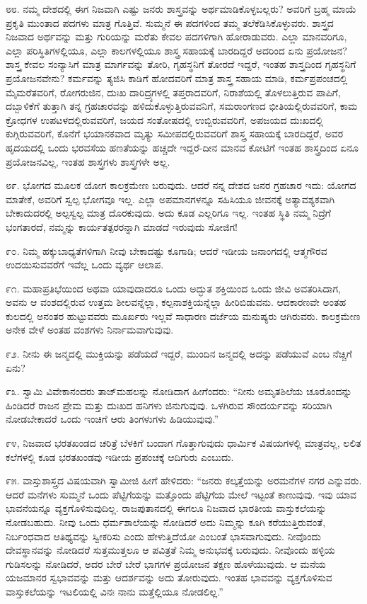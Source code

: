 ೮೮. ನಮ್ಮ ದೇಶದಲ್ಲಿ ಈಗ ನಿಜವಾಗಿ ಎಷ್ಟು ಜನರು ಶಾಸ್ತ್ರವನ್ನು ಅರ್ಥಮಾಡಿಕೊಳ್ಳಬಲ್ಲರು? ಅವರಿಗೆ ಬ್ರಹ್ಮ ಮಾಯೆ ಪ್ರಕೃತಿ ಮುಂತಾದ ಪದಗಳು ಮಾತ್ರ ಗೊತ್ತಿವೆ. ಸುಮ್ಮನೆ ಈ ಪದಗಳಿಂದ ತಮ್ಮ ತಲೆಕೆಡಿಸಿಕೊಳ್ಳುವರು. ಶಾಸ್ತ್ರದ ನಿಜವಾದ ಅರ್ಥವನ್ನು ಮತ್ತು ಗುರಿಯನ್ನು ಮರೆತು ಕೇವಲ ಪದಗಳಿಗಾಗಿ ಹೋರಾಡುವರು. ಎಲ್ಲಾ ಮಾನವರಿಗೂ, ಎಲ್ಲಾ ಪರಿಸ್ಥಿತಿಗಳಲ್ಲಿಯೂ, ಎಲ್ಲಾ ಕಾಲಗಳಲ್ಲಿಯೂ ಶಾಸ್ತ್ರ ಸಹಾಯಕ್ಕೆ ಬಾರದಿದ್ದರೆ ಅದರಿಂದ ಏನು ಪ್ರಯೋಜನ? ಶಾಸ್ತ್ರ ಕೇವಲ ಸಂನ್ಯಾಸಿಗೆ ಮಾತ್ರ ಮಾರ್ಗವನ್ನು ತೋರಿ, ಗೃಹಸ್ಥನಿಗೆ ತೋರದೆ ಇದ್ದರೆ, ಇಂತಹ ಶಾಸ್ತ್ರದಿಂದ ಗೃಹಸ್ಥನಿಗೆ ಪ್ರಯೋಜನವೇನು? ಕರ್ಮವನ್ನು ತ್ಯಜಿಸಿ ಕಾಡಿಗೆ ಹೋದವರಿಗೆ ಮಾತ್ರ ಶಾಸ್ತ್ರ ಸಹಾಯ ಮಾಡಿ, ಕರ್ಮಪ್ರಪಂಚದಲ್ಲಿ ಮೈಮರೆತವರಿಗೆ, ರೋಗರುಜಿನ, ದುಃಖ ದಾರಿದ್ರ್ಯಗಳಲ್ಲಿ ತಪ್ತರಾದವರಿಗೆ, ನಿರಾಶೆಯಲ್ಲಿ ತೊಳಲುತ್ತಿರುವ ಪಾಪಿಗೆ, ದಬ್ಬಾಳಿಕೆಗೆ ತುತ್ತಾಗಿ ತನ್ನ ಗ್ರಹಚಾರವನ್ನು ಹಳಿದುಕೊಳ್ಳುತ್ತಿರುವವನಿಗೆ, ಸಮರಾಂಗಣದ ಭೀತಿಯಲ್ಲಿರುವವರಿಗೆ, ಕಾಮ ಕ್ರೋಧಗಳ ಉಪಟಳದಲ್ಲಿರುವವರಿಗೆ, ಜಯದ ಸಂತೋಷದಲ್ಲಿ ಉಬ್ಬಿರುವವರಿಗೆ, ಅಪಜಯದ ದುಃಖದಲ್ಲಿ ಕುಗ್ಗಿರುವವರಿಗೆ, ಕೊನೆಗೆ ಭಯಾನಕವಾದ ಮೃತ್ಯು ಸಮೀಪದಲ್ಲಿರುವವರಿಗೆ ಶಾಸ್ತ್ರ ಸಹಾಯಕ್ಕೆ ಬಾರದಿದ್ದರೆ, ಅವರ ಹೃದಯದಲ್ಲಿ ಒಂದು ಭರವಸೆಯ ಹಣತೆಯನ್ನು ಹಚ್ಚದೇ ಇದ್ದರೆ-ದೀನ ಮಾನವ ಕೋಟಿಗೆ ಇಂತಹ ಶಾಸ್ತ್ರದಿಂದ ಏನೂ ಪ್ರಯೋಜನವಿಲ್ಲ, ಇಂತಹ ಶಾಸ್ತ್ರಗಳು ಶಾಸ್ತ್ರಗಳೇ ಅಲ್ಲ.

೮೯. ಭೋಗದ ಮೂಲಕ ಯೋಗ ಕಾಲಕ್ರಮೇಣ ಬರುವುದು. ಆದರೆ ನನ್ನ ದೇಶದ ಜನರ ಗ್ರಹಚಾರ ಇದು: ಯೋಗದ ಮಾತೇಕೆ, ಅವರಿಗೆ ಸ್ವಲ್ಪ ಭೋಗವೂ ಇಲ್ಲ. ಎಲ್ಲಾ ಅಪಮಾನಗಳನ್ನೂ ಸಹಿಸಿಯೂ ಜೀವನಕ್ಕೆ ಅತ್ಯಾವಶ್ಯಕವಾಗಿ ಬೇಕಾದುದರಲ್ಲಿ ಅಲ್ಪಸ್ವಲ್ಪ ಮಾತ್ರ ದೊರಕುವುದು. ಅದು ಕೂಡ ಎಲ್ಲರಿಗೂ ಇಲ್ಲ. ಇಂತಹ ಸ್ಥಿತಿ ನಮ್ಮ ನಿದ್ರೆಗೆ ಭಂಗತಾರದೆ, ನಮ್ಮನ್ನು ಕಾರ್ಯತತ್ಪರರನ್ನಾಗಿ ಮಾಡದೆ ಇರುವುದು ಸೋಜಿಗ!

೯೦. ನಿಮ್ಮ ಹಕ್ಕುಬಾಧ್ಯತೆಗಳಿಗಾಗಿ ನೀವು ಬೇಕಾದಷ್ಟು ಕೂಗಾಡಿ; ಆದರೆ ಇಡೀಯ ಜನಾಂಗದಲ್ಲಿ ಆತ್ಮಗೌರವ ಉದಯಿಸುವವರೆಗೆ ಇವೆಲ್ಲ ಒಂದು ವ್ಯರ್ಥ ಆಲಾಪ.

೯೧. ಮಹಾಪ್ರತಿಭೆಯಿಂದ ಅಥವಾ ಯಾವುದಾದರೂ ಒಂದು ಅದ್ಭುತ ಶಕ್ತಿಯಿಂದ ಒಂದು ಜೀವಿ ಅವತರಿಸಿದಾಗ, ಅವನು ಆ ವಂಶದಲ್ಲಿರುವ ಉತ್ತಮ ಶೀಲವನ್ನೆಲ್ಲಾ, ಕಲ್ಪನಾಶಕ್ತಿಯನ್ನೆಲ್ಲಾ ಹೀರಿಬಿಡುವನು. ಆದಕಾರಣವೇ ಅಂತಹ ಕುಲದಲ್ಲಿ ಅನಂತರ ಹುಟ್ಟುವವರು ಮೂರ್ಖರು ಇಲ್ಲವೆ ಸಾಧಾರಣ ದರ್ಜೆಯ ಮನುಷ್ಯರು ಆಗಿರುವರು. ಕಾಲಕ್ರಮೇಣ ಅನೇಕ ವೇಳೆ ಅಂತಹ ವಂಶಗಳು ನಿರ್ನಾಮವಾಗುವುವು.

೯೨. ನೀನು ಈ ಜನ್ಮದಲ್ಲಿ ಮುಕ್ತಿಯನ್ನು ಪಡೆಯದೆ ಇದ್ದರೆ, ಮುಂದಿನ ಜನ್ಮದಲ್ಲಿ ಅದನ್ನು ಪಡೆಯುವೆ ಎಂಬ ನೆಚ್ಚಿಗೆ ಏನು?

೯೩. ಸ್ವಾಮಿ ವಿವೇಕಾನಂದರು ತಾಜ್‌ಮಹಲನ್ನು ನೋಡಿದಾಗ ಹೀಗೆಂದರು: “ನೀನು ಅಮೃತಶಿಲೆಯ ಚೂರೊಂದನ್ನು ಹಿಂಡಿದರೆ ರಾಜನ ಪ್ರೇಮ ಮತ್ತು ದುಃಖದ ಹನಿಗಳು ಜಿನುಗುವುವು. ಒಳಗಿರುವ ಸೌಂದರ್ಯವನ್ನು ಸರಿಯಾಗಿ ನೋಡಬೇಕಾದರೆ ಒಂದು ಇಂಚಿಗೆ ಆರು ತಿಂಗಳುಗಳು ಹಿಡಿಯುವುವು.”

೯೪, ನಿಜವಾದ ಭರತಖಂಡದ ಚರಿತ್ರೆ ಬೆಳಕಿಗೆ ಬಂದಾಗ ಗೊತ್ತಾಗುವುದು ಧಾರ್ಮಿಕ ವಿಷಯಗಳಲ್ಲಿ ಮಾತ್ರವಲ್ಲ, ಲಲಿತ ಕಲೆಗಳಲ್ಲಿ ಕೂಡ ಭರತಖಂಡವು ಇಡೀಯ ಪ್ರಪಂಚಕ್ಕೆ ಆದಿಗುರು ಎಂಬುದು.

೯೫. ವಾಸ್ತುಶಾಸ್ತ್ರದ  ವಿಷಯವಾಗಿ ಸ್ವಾಮೀಜಿ ಹೀಗೆ ಹೇಳಿದರು: “ಜನರು ಕಲ್ಕತ್ತೆಯನ್ನು ಅರಮನೆಗಳ ನಗರ ಎನ್ನುವರು. ಆದರೆ ಮನೆಗಳು ಸುಮ್ಮನೆ ಒಂದು ಪೆಟ್ಟಿಗೆಯನ್ನು ಮತ್ತೊಂದು ಪೆಟ್ಟಿಗೆಯ ಮೇಲೆ ಇಟ್ಟಂತೆ ಕಾಣುವುವು. ಇವು ಯಾವ ಭಾವನೆಯನ್ನೂ ವ್ಯಕ್ತಗೊಳಿಸುವುದಿಲ್ಲ. ರಾಜಪುತಾನದಲ್ಲಿ ಈಗಲೂ ನಿಜವಾದ ಭಾರತೀಯ ವಾಸ್ತುಕಲೆಯನ್ನು ನೋಡಬಹುದು. ನೀವು ಒಂದು ಧರ್ಮಶಾಲೆಯನ್ನು ನೋಡಿದರೆ ಅದು ನಿಮ್ಮನ್ನು ಕೂಗಿ ಕರೆಯುತ್ತಿರುವಂತೆ, ನಿರ್ಬಂಧವಾದ ಆತಿಥ್ಯವನ್ನು ಸ್ವೀಕರಿಸು ಎಂದು ಹೇಳುತ್ತಿದೆಯೋ ಎಂಬಂತೆ ಭಾಸವಾಗುವುದು. ನೀವೊಂದು ದೇವಸ್ಥಾನವನ್ನು ನೋಡಿದರೆ ಸುತ್ತಮುತ್ತಲೂ ಆ ಪವಿತ್ರತೆ ನಿಮ್ಮ ಅನುಭವಕ್ಕೆ ಬರುವುದು. ನೀವೊಂದು ಹಳ್ಳಿಯ ಗುಡಿಸಲನ್ನು ನೋಡಿದರೆ, ಅದರ ಬೇರೆ ಬೇರೆ ಭಾಗಗಳ ಪ್ರಯೋಜನ ತಕ್ಷಣ ಹೊಳೆಯುವುದು. ಆ ಮನೆಯ ಯಜಮಾನರ ಸ್ವಭಾವವನ್ನು ಮತ್ತು ಆದರ್ಶವನ್ನು ಅದು ತೋರುವುದು. ಇಂತಹ ಭಾವವನ್ನು ವ್ಯಕ್ತಗೊಳಿಸುವ ವಾಸ್ತುಕಲೆಯನ್ನು ಇಟಲಿಯಲ್ಲಿ ವಿನಃ ನಾನು ಮತ್ತೆಲ್ಲಿಯೂ ನೋಡಲಿಲ್ಲ.”

